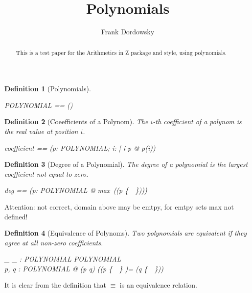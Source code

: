 \documentclass[12pt]{scrartcl}
\newtheorem{zdef}{Definition}[section]
\begin{document}
\title{Polynomials}
\author{Frank Dordowsky}

\maketitle

\begin{abstract}
  This is a test paper for the Arithmetics in Z package and style,
  using polynomials.
\end{abstract}





\begin{zdef}[Polynomials]
  \label{zdef:polynomials}
  \begin{zed}
    POLYNOMIAL == (\nat \ffun \real) \setminus \emptyset
  \end{zed}
\end{zdef}

\begin{zdef}[Coeefficients of a Polynom]
  \label{zdef:coefficient}
  The $i$-th coefficient of a polynom is the real value at position
  $i$. 
  \begin{zed}
    coefficient == (\lambda p: POLYNOMIAL; i: \nat | i \in \dom p @
    p(i))
  \end{zed}
\end{zdef}

\begin{zdef}[Degree of a Polynomial]
  The degree of a polynomial is the largest coefficient not equal to
  zero.
  \label{zdef:degree}
  \begin{zed}
    deg == (\lambda p: POLYNOMIAL @ max~(\dom (p \nrres
  \{~\azero~\})))
  \end{zed}
\end{zdef}
Attention: not correct, domain above may be emtpy, for emtpy sets max
not defined!

\begin{zdef}[Equivalence of Polynoms]
  \label{zdef:polynom-equivalence}
  Two polynomials are equivalent if they agree at all non-zero
  coefficients. 
\newcommand{\polyeq}{\equiv}
  \begin{axdef}
    \_ \polyeq \_ : POLYNOMIAL \rel POLYNOMIAL\\
    \where \forall p, q : POLYNOMIAL @ (p \polyeq q) \iff ((p \nrres
    \{~\azero~\} )= (q \nrres \{~\azero~\}))
  \end{axdef}
\end{zdef}
It is clear from the definition that $\equiv$ is an equivalence
relation.
\end{document}
